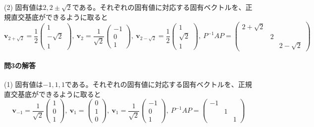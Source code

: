 \noindent (2) 固有値は$2, 2 \pm \sqrt{2}$である。それぞれの固有値に対応する固有ベクトルを、正規直交基底ができるように取ると
\[
\bm{v}_{2 + \sqrt{2}} =
\frac{1}{2}
\begin{pmatrix}
1 \\
-\sqrt{2} \\
1
\end{pmatrix}, \ 
\bm{v}_{2} =
\frac{1}{\sqrt{2}}
\begin{pmatrix}
-1 \\
0 \\
1
\end{pmatrix}, \ 
\bm{v}_{2 - \sqrt{2}} =
\frac{1}{2}
\begin{pmatrix}
1 \\
\sqrt{2} \\
1
\end{pmatrix}, \ 
P^{-1} A P 
= 
\begin{pmatrix}
2 + \sqrt{2} \\
& 2 \\
& & 2 - \sqrt{2}
\end{pmatrix}
\]


\paragraph{問3の解答}

\noindent (1) 固有値は$-1, 1, 1$である。それぞれの固有値に対応する固有ベクトルを、正規直交基底ができるように取ると
\[
\bm{v}_{-1} =
\frac{1}{\sqrt{2}}
\begin{pmatrix}
1 \\
0 \\
1
\end{pmatrix}, \ 
\bm{v}_{1} =
\begin{pmatrix}
0 \\
1 \\
0
\end{pmatrix}, \ 
\bm{v}_{1} =
\frac{1}{\sqrt{2}}
\begin{pmatrix}
-1 \\
0 \\
1
\end{pmatrix}, \ 
P^{-1} A P 
= 
\begin{pmatrix}
-1 \\
& 1 \\
& & 1
\end{pmatrix}
\]

